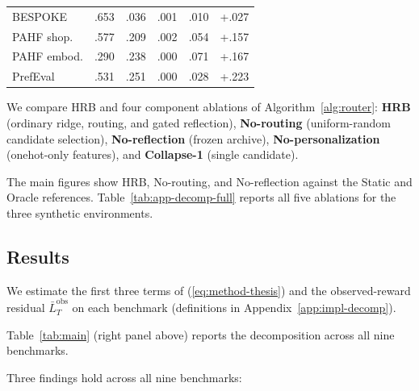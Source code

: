 \documentclass{article} %
\renewcommand{\eqref}[1]{\textup{(\ref{#1})}}
\begin{document}
\begin{table}[t]
\begin{minipage}[t]{0.50\textwidth}
\begin{tabular}{lccccc}
BESPOKE       & .653 & .036 & .001 & .010 & +.027 \\
PAHF shop.    & .577 & .209 & .002 & .054 & +.157 \\
PAHF embod.   & .290 & .238 & .000 & .071 & +.167 \\
PrefEval      & .531 & .251 & .000 & .028 & +.223 \\
\bottomrule
\end{tabular}
\endgroup
{}
\label{tab:main}\label{tab:e6-decomp}
\end{minipage}
\end{table}

We compare HRB and four component ablations of Algorithm~\ref{alg:router}: \textbf{HRB} (ordinary ridge, routing, and gated reflection), \textbf{No-routing} (uniform-random candidate selection), \textbf{No-reflection} (frozen archive), \textbf{No-personalization} (onehot-only features), and \textbf{Collapse-1} (single candidate).

The main figures show HRB, No-routing, and No-reflection against the Static
and Oracle references. Table~\ref{tab:app-decomp-full} reports all five
ablations for the three synthetic environments.

\subsection{Results}

\label{sec:exp-results}

We estimate the first three terms of \eqref{eq:method-thesis} and the observed-reward residual \(\bar L_T^{\mathrm{obs}}\) on each benchmark (definitions in Appendix~\ref{app:impl-decomp}).

Table~\ref{tab:main} (right panel above) reports the decomposition across all nine benchmarks.

Three findings hold across all nine benchmarks:
\end{document}
